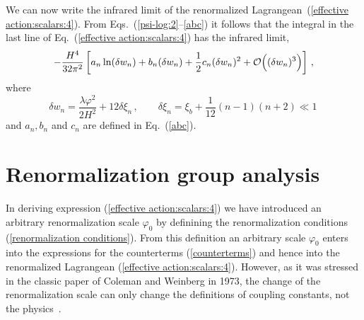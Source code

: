 \documentclass[aps,12pt,superscriptaddress,preprintnumbers,
                secnumarabic,nofootinbib,showpacs]{revtex4}
\begin{document}
 We can now write the infrared limit of the
 renormalized Lagrangean~(\ref{effective action:scalars:4}).
From Eqs.~(\ref{psi-log:2}--\ref{abc}) it follows that
the integral in the last line of Eq.~(\ref{effective action:scalars:4})
has the infrared limit,
\begin{equation}
 -\frac{H^4}{32\pi^2}\left[
                          a_n\ln(\delta w_n)
                        + b_n(\delta w_n)
                        + \frac12c_n(\delta w_n)^2
                        + {\cal O}\Big((\delta w_n)^3\Big)
                    \right]
\,,
\label{Veff:IR integral}
\end{equation}
where
\begin{equation}
  \delta w_n = \frac{\lambda\varphi^2}{2H^2} + 12 \delta\xi_n
 \,,\qquad \delta\xi_n = \xi_b + \frac{1}{12}(n-1)(n+2)\ll 1
\,
\label{delta w_n}
\end{equation}
and $a_n,b_n$ and $c_n$ are defined in Eq.~(\ref{abc}).

\section{Renormalization group analysis}
\label{Renormalization group analysis}

In deriving expression (\ref{effective action:scalars:4}) we have
introduced an arbitrary renormalization scale $\varphi_0$ by definining
the renormalization conditions (\ref{renormalization
conditions}). From this definition an arbitrary scale
$\varphi_{0}$ enters into the expressions for the counterterms
(\ref{counterterms}) and hence into the renormalized Lagrangean
(\ref{effective action:scalars:4}). However, as it was stressed in
the classic paper of Coleman and Weinberg in 1973, the change of
the renormalization scale can only change the definitions of coupling
constants, not the physics~\cite{ColemanWeinberg:1973}.
\end{document}

